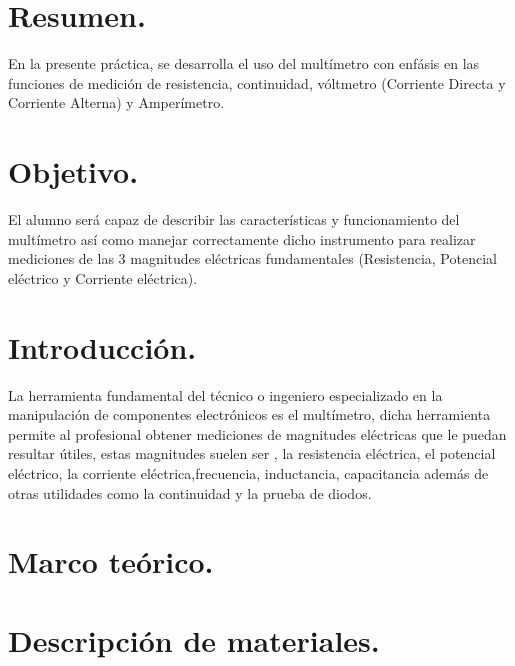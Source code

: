 \documentclass[10pt]{article}
\begin{document}
\tableofcontents
\newpage

\section{Resumen.}
En la presente práctica, se desarrolla el uso del multímetro con enfásis en las funciones de medición de resistencia, continuidad, vóltmetro (Corriente Directa y Corriente Alterna) y Amperímetro. 

\begin{multicols}{2}

\section{Objetivo.}

El alumno será capaz de describir las características y funcionamiento del multímetro así como manejar correctamente dicho instrumento para realizar mediciones de las 3 magnitudes eléctricas fundamentales (Resistencia, Potencial eléctrico y Corriente eléctrica).

\section{Introducción.}

La herramienta fundamental del técnico o ingeniero especializado en la manipulación de componentes electrónicos es el multímetro, dicha herramienta permite al profesional obtener mediciones de magnitudes eléctricas que le puedan resultar útiles,
estas magnitudes suelen ser , la resistencia eléctrica, el potencial eléctrico, la corriente eléctrica,frecuencia, inductancia, capacitancia además de otras utilidades como la continuidad y la prueba de diodos.

\section{Marco teórico.}



\section{Descripción de materiales.}

\begin{center}


\end{center}
\end{multicols}
\end{document}
